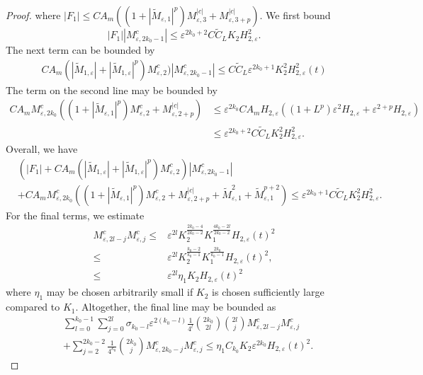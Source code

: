 \documentclass[]{article}
\theoremstyle{remark}
\begin{document}
\begin{proof}
where $|F_1|\leq{}CA_m((1+|\widetilde{M}_{\varepsilon,1}|^p)M_{\varepsilon,3}^{|c|}+M_{\varepsilon,3+p}^{|c|})$. We first bound \[|F_1||M_{\varepsilon,2k_0-1}^c|\leq{}\varepsilon^{2k_0+2}C\tilde{C}_LK_{2}H_{2,\varepsilon}^2.\]
The next term can be bounded by
\begin{align*}
CA_m(|\widetilde{M}_{1,\varepsilon}|+|\widetilde{M}_{1,\varepsilon}|^p)M_{\varepsilon,2}^c)|M_{\varepsilon,2k_0-1}^c|\leq{}C\tilde{C}_L\varepsilon^{2k_0+1}K_{2}^2H_{2,\varepsilon}^2(t)
\end{align*}
The term on the second line may be bounded by
\begin{align*}
CA_m{}M_{\varepsilon,2k_0}^c\left((1+|\widetilde{M}_{\varepsilon,1}|^p)M_{\varepsilon,2}^c+M_{\varepsilon,2+p}^{|c|}\right)&\leq{}\varepsilon^{2k_0}CA_mH_{2,\varepsilon}((1+L^p)\varepsilon^2{}H_{2,\varepsilon}+\varepsilon^{2+p}H_{2,\varepsilon})\\
&\leq{}\varepsilon^{2k_0+2}C\tilde{C}_LK_{2}^2H_{2,\varepsilon}^2.
\end{align*}
Overall, we have
\begin{align*}
&(|F_1|+CA_m(|\widetilde{M}_{1,\varepsilon}|+|\widetilde{M}_{1,\varepsilon}|^p)M_{\varepsilon,2}^c)|M_{\varepsilon,2k_0-1}^c|\\
&+CA_m{}M_{\varepsilon,2k_0}^c\left((1+|\widetilde{M}_{\varepsilon,1}|^p)M_{\varepsilon,2}^c+M_{\varepsilon,2+p}^{|c|}+\widetilde{M}_{\varepsilon,1}^2+\widetilde{M}_{\varepsilon,1}^{p+2}\right)\leq{}\varepsilon^{2k_0+1}C\tilde{C}_LK_{2}^2H_{2,\varepsilon}^2.
\end{align*}
For the final terms, we estimate
\begin{align*}
M_{\varepsilon,2l-j}^{c}M_{\varepsilon,j}^{c}\leq{}&\varepsilon^{2l}K_{2}^\frac{2k_0-4}{2k_0-2}K_{1}^\frac{4k_0-2l}{2k_0-2}H_{2,\varepsilon}(t)^2\\
\leq{}&\varepsilon^{2l}K_2^\frac{k_0-2}{k_0-1}K_1^\frac{2k_0}{k_0-1}H_{2,\varepsilon}(t)^2,\\
\leq{}&\varepsilon^{2l}\eta_1K_2H_{2,\varepsilon}(t)^2
\end{align*}
where $\eta_1$ may be chosen arbitrarily small if $K_2$ is chosen sufficiently large compared to $K_1$. Altogether, the final line may be bounded as 
\begin{align*}
&\sum_{l=0}^{k_0-1}\sum_{j=0}^{2l}\sigma_{k_0-l}\varepsilon^{2(k_0-l)}\frac{1}{4^l}{2k_0\choose{2l}}{2l\choose{j}}M_{\varepsilon,2l-j}^c{}M_{\varepsilon,j}^c\\
&+\sum_{j=2}^{2k_0-2}\frac{1}{4^{k_0}}{2k_0\choose{j}}M_{\varepsilon,2k_0-j}^c{}M_{\varepsilon,j}^c\leq{}\eta_1C_{k_0}K_2\varepsilon^{2k_0}H_{2,\varepsilon}(t)^2.

\end{align*}
\end{proof}
\end{document}
